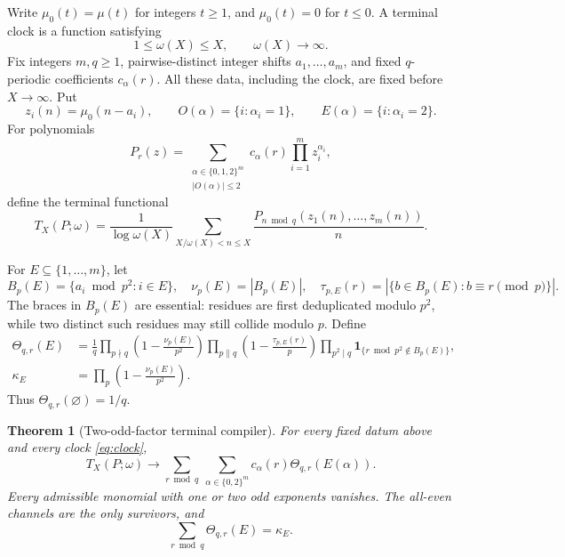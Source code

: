 \documentclass[11pt]{article}
\newtheorem{theorem}{Theorem}[section]
\theoremstyle{definition}
\theoremstyle{remark}
\newcommand{\mob}{\mu}
\newcommand{\kap}{\kappa}
\newcommand{\ind}{\mathbf 1}
\begin{document}
Write \(\mob_0(t)=\mob(t)\) for integers \(t\ge1\), and
\(\mob_0(t)=0\) for \(t\le0\).  A terminal clock is a function satisfying
\begin{equation}
 1\le \omega(X)\le X,\qquad \omega(X)\longrightarrow\infty.
 \label{eq:clock}
\end{equation}
Fix integers \(m,q\ge1\), pairwise-distinct integer shifts
\(a_1,\ldots,a_m\), and fixed \(q\)-periodic coefficients
\(c_\alpha(r)\).  All these data, including the clock, are fixed before
\(X\to\infty\).  Put
\[
 z_i(n)=\mob_0(n-a_i),\qquad
 O(\alpha)=\{i:\alpha_i=1\},\qquad
 E(\alpha)=\{i:\alpha_i=2\}.
\]
For polynomials
\begin{equation}
 P_r(z)=\sum_{\substack{\alpha\in\{0,1,2\}^m\\|O(\alpha)|\le2}}
 c_\alpha(r)\prod_{i=1}^m z_i^{\alpha_i},
 \label{eq:poly}
\end{equation}
define the terminal functional
\begin{equation}
 T_X(P;\omega)=\frac1{\log\omega(X)}
 \sum_{X/\omega(X)<n\le X}\frac{P_{n\bmod q}(z_1(n),\ldots,z_m(n))}{n}.
 \label{eq:functional}
\end{equation}

For \(E\subseteq\{1,\ldots,m\}\), let
\begin{equation}
 B_p(E)=\{a_i\bmod p^2:i\in E\},\quad
 \nu_p(E)=|B_p(E)|,
 \quad \tau_{p,E}(r)=|\{b\in B_p(E):b\equiv r\pmod p\}|.
 \label{eq:local-data}
\end{equation}
The braces in \(B_p(E)\) are essential: residues are first deduplicated
modulo \(p^2\), while two distinct such residues may still collide modulo
\(p\).  Define
\begin{align}
 \Theta_{q,r}(E)
  &=\frac1q\prod_{p\nmid q}\left(1-\frac{\nu_p(E)}{p^2}\right)
    \prod_{p\parallel q}\left(1-\frac{\tau_{p,E}(r)}p\right)
    \prod_{p^2\mid q}\ind_{\{r\bmod p^2\notin B_p(E)\}},
 \label{eq:theta}\\
 \kap_E&=\prod_p\left(1-\frac{\nu_p(E)}{p^2}\right).
 \label{eq:kappa}
\end{align}
Thus \(\Theta_{q,r}(\varnothing)=1/q\).

\begin{theorem}[Two-odd-factor terminal compiler]
\label{thm:compiler}
For every fixed datum above and every clock \eqref{eq:clock},
\begin{equation}
 T_X(P;\omega)\longrightarrow
 \sum_{r\bmod q}\ \sum_{\alpha\in\{0,2\}^m}
 c_\alpha(r)\Theta_{q,r}(E(\alpha)).
 \label{eq:compiler}
\end{equation}
Every admissible monomial with one or two odd exponents vanishes.  The
all-even channels are the only survivors, and
\begin{equation}
 \sum_{r\bmod q}\Theta_{q,r}(E)=\kap_E.
 \label{eq:phase-sum}
\end{equation}
\end{theorem}
\end{document}

